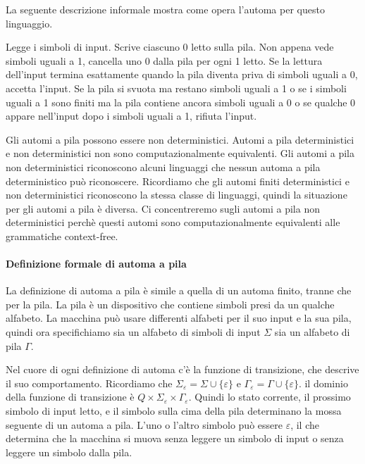 \documentclass{article}
\begin{document}
La seguente descrizione informale mostra come opera l'automa per questo linguaggio.
\vspace{1em}

Legge i simboli di input. Scrive ciascuno 0 letto sulla pila. Non appena vede simboli uguali a 1, cancella uno 0 dalla pila per ogni 1 letto. Se la lettura dell'input termina esattamente quando la pila diventa priva di simboli uguali a 0, accetta l'input. Se la pila si svuota ma restano simboli uguali a 1 o se i simboli uguali a 1 sono finiti ma la pila contiene ancora simboli uguali a 0 o se qualche 0 appare nell'input dopo i simboli uguali a 1, rifiuta l'input.
\vspace{2em}

Gli automi a pila possono essere non deterministici. 
Automi a pila deterministici e non deterministici non sono computazionalmente equivalenti. 
Gli automi a pila non deterministici riconoscono alcuni linguaggi che nessun automa a pila deterministico può riconoscere. Ricordiamo che gli automi finiti deterministici e non deterministici riconoscono la stessa classe di linguaggi, quindi la situazione per gli automi a pila è diversa. Ci concentreremo sugli automi a pila non deterministici perchè questi automi sono computazionalmente equivalenti alle grammatiche context-free.

\paragraph{Definizione formale di automa a pila}
\text{ }

La definizione di automa a pila è simile a quella di un automa finito, tranne che per la pila. La pila è un dispositivo che contiene simboli presi da un qualche alfabeto. La macchina può usare differenti alfabeti per il suo input e la sua pila, quindi ora specifichiamo sia un alfabeto di simboli di input $\Sigma$ sia un alfabeto di pila $\Gamma$.

Nel cuore di ogni definizione di automa c'è la funzione di transizione, che descrive il suo comportamento. Ricordiamo che $\Sigma_\varepsilon = \Sigma \cup \{\varepsilon \}$ e $\Gamma_\varepsilon = \Gamma \cup \{\varepsilon \}$. il dominio della funzione di transizione è $Q \times \Sigma_{\varepsilon} \times \Gamma_\varepsilon$.
Quindi lo stato corrente, il prossimo simbolo di input letto, e il simbolo sulla cima della pila determinano la mossa seguente di un automa a pila.
L'uno o l'altro simbolo può essere $\varepsilon$, il che determina che la macchina si muova senza leggere un simbolo di input o senza leggere un simbolo dalla pila.
\end{document}
